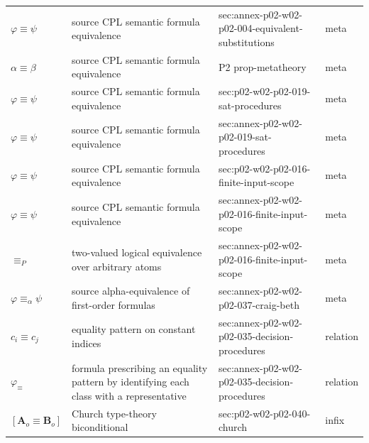 \begin{longtable}{@{}p{}p{}p{}p{}@{}}
\(\varphi\equiv\psi\) & source CPL semantic formula equivalence & sec:\allowbreak{}annex-\allowbreak{}p02-\allowbreak{}w02-\allowbreak{}p02-\allowbreak{}004-\allowbreak{}equivalent-\allowbreak{}substitutions & meta \\
\(\alpha\equiv\beta\) & source CPL semantic formula equivalence & P2 prop-\allowbreak{}metatheory & meta \\
\(\varphi\equiv\psi\) & source CPL semantic formula equivalence & sec:\allowbreak{}p02-\allowbreak{}w02-\allowbreak{}p02-\allowbreak{}019-\allowbreak{}sat-\allowbreak{}procedures & meta \\
\(\varphi\equiv\psi\) & source CPL semantic formula equivalence & sec:\allowbreak{}annex-\allowbreak{}p02-\allowbreak{}w02-\allowbreak{}p02-\allowbreak{}019-\allowbreak{}sat-\allowbreak{}procedures & meta \\
\(\varphi\equiv\psi\) & source CPL semantic formula equivalence & sec:\allowbreak{}p02-\allowbreak{}w02-\allowbreak{}p02-\allowbreak{}016-\allowbreak{}finite-\allowbreak{}input-\allowbreak{}scope & meta \\
\(\varphi\equiv\psi\) & source CPL semantic formula equivalence & sec:\allowbreak{}annex-\allowbreak{}p02-\allowbreak{}w02-\allowbreak{}p02-\allowbreak{}016-\allowbreak{}finite-\allowbreak{}input-\allowbreak{}scope & meta \\
\(\equiv_P\) & two-valued logical equivalence over arbitrary atoms & sec:\allowbreak{}annex-\allowbreak{}p02-\allowbreak{}w02-\allowbreak{}p02-\allowbreak{}016-\allowbreak{}finite-\allowbreak{}input-\allowbreak{}scope & meta \\
\(\varphi\equiv_\alpha\psi\) & source alpha-equivalence of first-order formulas & sec:\allowbreak{}annex-\allowbreak{}p02-\allowbreak{}w02-\allowbreak{}p02-\allowbreak{}037-\allowbreak{}craig-\allowbreak{}beth & meta \\
\(c_i\equiv c_j\) & equality pattern on constant indices & sec:\allowbreak{}annex-\allowbreak{}p02-\allowbreak{}w02-\allowbreak{}p02-\allowbreak{}035-\allowbreak{}decision-\allowbreak{}procedures & relation \\
\(\varphi_\equiv\) & formula prescribing an equality pattern by identifying each class with a representative & sec:\allowbreak{}annex-\allowbreak{}p02-\allowbreak{}w02-\allowbreak{}p02-\allowbreak{}035-\allowbreak{}decision-\allowbreak{}procedures & relation \\
\([\mathbf A_o\equiv\mathbf B_o]\) & Church type-theory biconditional & sec:\allowbreak{}p02-\allowbreak{}w02-\allowbreak{}p02-\allowbreak{}040-\allowbreak{}church & infix \\

\end{longtable}
